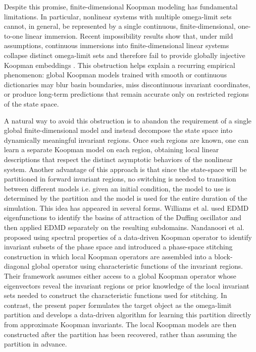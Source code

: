 \documentclass[letterpaper, 10 pt, conference]{ieeeconf}
\begin{document}
Despite this promise, finite-dimensional Koopman modeling has fundamental limitations. In particular, nonlinear systems with multiple omega-limit sets cannot, in general, be represented by a single continuous, finite-dimensional, one-to-one linear immersion. Recent impossibility results show that, under mild assumptions, continuous immersions into finite-dimensional linear systems collapse distinct omega-limit sets and therefore fail to provide globally injective Koopman embeddings \cite{ZL-NO-EDS:25}. This obstruction helps explain a recurring empirical phenomenon: global Koopman models trained with smooth or continuous dictionaries may blur basin boundaries, miss discontinuous invariant coordinates, or produce long-term predictions that remain accurate only on restricted regions of the state space.

A natural way to avoid this obstruction is to abandon the requirement of a single global finite-dimensional model and instead decompose the state space into dynamically meaningful invariant regions. Once such regions are known, one can learn a separate Koopman model on each region, obtaining local linear descriptions that respect the distinct asymptotic behaviors of the nonlinear system. Another advantage of this approach is that since the state-space will be partitioned in forward invariant regions, no switching is needed to transition between different models i.e. given an initial condition, the model to use is determined by the partition and the model is used for the entire duration of the simulation. This idea has appeared in several forms. Williams et al. \cite{MOW-IGK-CWR:15} used EDMD eigenfunctions to identify the basins of attraction of the Duffing oscillator and then applied EDMD separately on the resulting subdomains. Nandanoori et al. \cite{SPN-SS-EY:20} proposed using spectral properties of a data-driven Koopman operator to identify invariant subsets of the phase space and introduced a phase-space stitching construction in which local Koopman operators are assembled into a block-diagonal global operator using characteristic functions of the invariant regions. Their framework assumes either access to a global Koopman operator whose eigenvectors reveal the invariant regions or prior knowledge of the local invariant sets needed to construct the characteristic functions used for stitching. In contrast, the present paper formulates the target object as the omega-limit partition and develops a data-driven algorithm for learning this partition directly from approximate Koopman invariants. The local Koopman models are then constructed after the partition has been recovered, rather than assuming the partition in advance.
\end{document}
